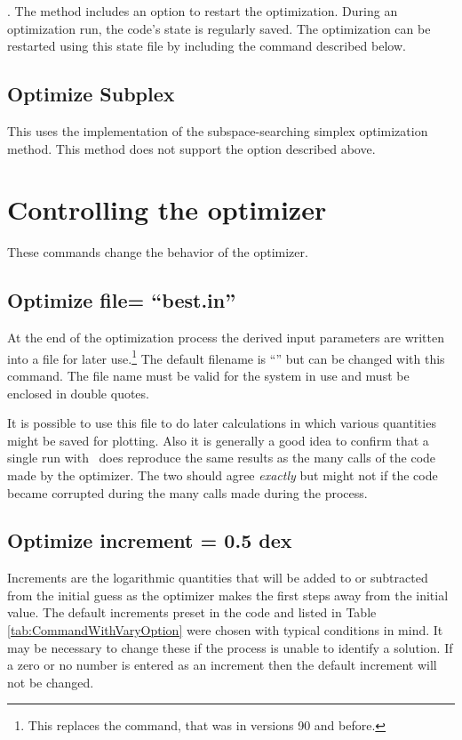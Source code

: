 . The  method includes an option to
restart the optimization. During an optimization run, the code's state is
regularly saved. The optimization can be
restarted using this state file by including the command  described below.

\subsection{Optimize Subplex}

This uses the \citet{Rowan1990} implementation of the subspace-searching
simplex optimization method. This method does not support the
 option described above.

\section{Controlling the optimizer}
\label{sec:controlling_optimizer}

These commands change the behavior of the optimizer.

\subsection{Optimize file= ``best.in''}
\label{sec:optimize_file}

At the end of the optimization process the derived input parameters are
written into a file for later use.\footnote{This replaces the  command, that was in versions 90
and before.}  The default filename is
``'' but can be changed with this command.
The file name must
be valid for the system in use and must be enclosed in double quotes.

It is possible to use this file to do later calculations in which various
quantities might be saved for plotting.
Also it is generally a good idea
to confirm that a single run with \Cloudy\ does reproduce the same results
as the many calls of the code made by the optimizer.
The two should agree
\emph{exactly} but might not if the code became corrupted
during the many calls
made during the process.

\subsection{Optimize increment = 0.5 dex}

Increments are the logarithmic quantities that will be added to or
subtracted from the initial guess as the optimizer makes the first steps
away from the initial value.
The default increments preset in the code
and listed in Table \ref{tab:CommandWithVaryOption} were chosen with
typical conditions in mind.
It may be necessary to change these if the process is
unable to identify
a solution.
If a zero or no number is entered as an increment then
the default increment will not be changed.

